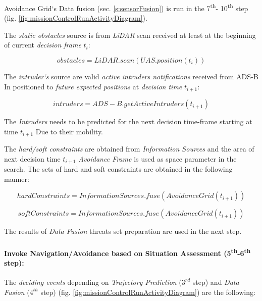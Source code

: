 \begin{note}
    Avoidance Grid`s Data fusion (sec. \ref{s:sensorFusion}) is run in the  7\textsuperscript{th}- 10\textsuperscript{th} step (fig. \ref{fig:missionControlRunActivityDiagram}). 
\end{note}

The \emph{static obstacles} source is from \emph{LiDAR} scan received at least at the  beginning of current \emph{decision frame} $t_i$:

\begin{equation*}
        obstacles=LiDAR.scan(UAS.position(t_i))
\end{equation*}

The \emph{intruder`s} source are valid \emph{active intruders notifications} received from ADS-B In positioned to \emph{future expected positions} at \emph{decision time} $t_{i+1}$:

\begin{equation*}
        intruders=ADS-B.get Active Intruders(t_{i+1})
\end{equation*}

\begin{note}
    The \emph{Intruders} needs to be predicted for the next decision time-frame starting at time $t_{i+1}$ Due to their mobility.
\end{note}

\noindent The \emph{hard/soft constraints} are obtained from \emph{Information Sources} and the area of next decision time $t_{i+1}$ \emph{Avoidance Frame} is used as space parameter in the search. The sets of hard and soft constraints are obtained in the following manner:

\begin{equation*}
    hard Constraints= Information Sources.fuse(Avoidance Grid(t_{i+1}))
\end{equation*}

\begin{equation*}        
        soft Constraints=Information Sources.fuse(Avoidance Grid(t_{i+1}))
\end{equation*}

\noindent The results of \emph{Data Fusion} threats set preparation are used in the next step.


\paragraph{Invoke Navigation/Avoidance based on Situation Assessment (5\textsuperscript{th}-6\textsuperscript{th} step):} The \emph{deciding events} depending on \emph{Trajectory Prediction} ($3^{rd}$ step) and \emph{Data Fusion} ($4^{th}$ step) (fig. \ref{fig:missionControlRunActivityDiagram}) are the following:

